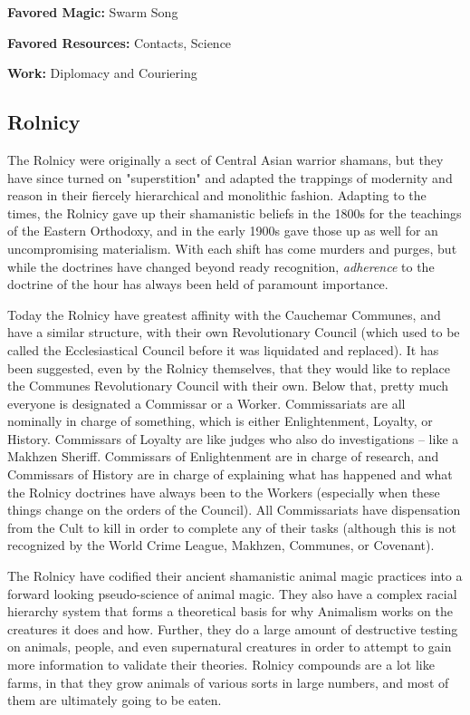\textbf{Favored Magic:}  Swarm Song

\textbf{Favored Resources:} Contacts, Science

\textbf{Work:} Diplomacy and Couriering

\subsection{Rolnicy} 

The Rolnicy were originally a sect of Central Asian warrior shamans, but they have since turned on "superstition" and adapted the trappings of modernity and reason in their fiercely hierarchical and monolithic fashion. Adapting to the times, the Rolnicy gave up their shamanistic beliefs in the 1800s for the teachings of the Eastern Orthodoxy, and in the early 1900s gave those up as well for an uncompromising materialism. With each shift has come murders and purges, but while the doctrines have changed beyond ready recognition, \textit{adherence} to the doctrine of the hour has always been held of paramount importance.

Today the Rolnicy have greatest affinity with the Cauchemar Communes, and have a similar structure, with their own Revolutionary Council (which used to be called the Ecclesiastical Council before it was liquidated and replaced). It has been suggested, even by the Rolnicy themselves, that they would like to replace the Communes Revolutionary Council with their own. Below that, pretty much everyone is designated a Commissar or a Worker. Commissariats are all nominally in charge of something, which is either Enlightenment, Loyalty, or History. Commissars of Loyalty are like judges who also do investigations -- like a Makhzen Sheriff. Commissars of Enlightenment are in charge of research, and Commissars of History are in charge of explaining what has happened and what the Rolnicy doctrines have always been to the Workers (especially when these things change on the orders of the Council). All Commissariats have dispensation from the Cult to kill in order to complete any of their tasks (although this is not recognized by the World Crime League, Makhzen, Communes, or Covenant).

The Rolnicy have codified their ancient shamanistic animal magic practices into a forward looking pseudo-science of animal magic. They also have a complex racial hierarchy system that forms a theoretical basis for why Animalism works on the creatures it does and how. Further, they do a large amount of destructive testing on animals, people, and even supernatural creatures in order to attempt to gain more information to validate their theories. Rolnicy compounds are a lot like farms, in that they grow animals of various sorts in large numbers, and most of them are ultimately going to be eaten.

